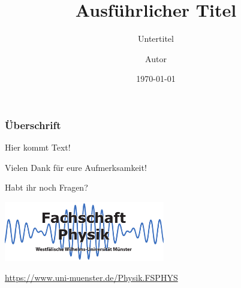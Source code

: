 \documentclass[german, ngerman]{beamer}
\title[Kurzer Titel]{Ausführlicher Titel}
\subtitle{Untertitel}
\author{Autor}
\institute{Fachschaft Physik}
\date{\today}
\begin{document}
\begin{frame}[plain]
	\titlepage
\end{frame}

\begin{frame}
	\frametitle{Überschrift}

	Hier kommt Text!
\end{frame}

\begin{frame}
	\begin{block}{}
		\centering
		Vielen Dank für eure Aufmerksamkeit!
	\end{block}

	\begin{block}{}
		\centering
		Habt ihr noch Fragen?
	\end{block}

	\begin{center}
		\includegraphics[width=7cm]{fsphys-logo.pdf}

		\medskip
		\url{https://www.uni-muenster.de/Physik.FSPHYS}
	\end{center}
\end{frame}
\end{document}
